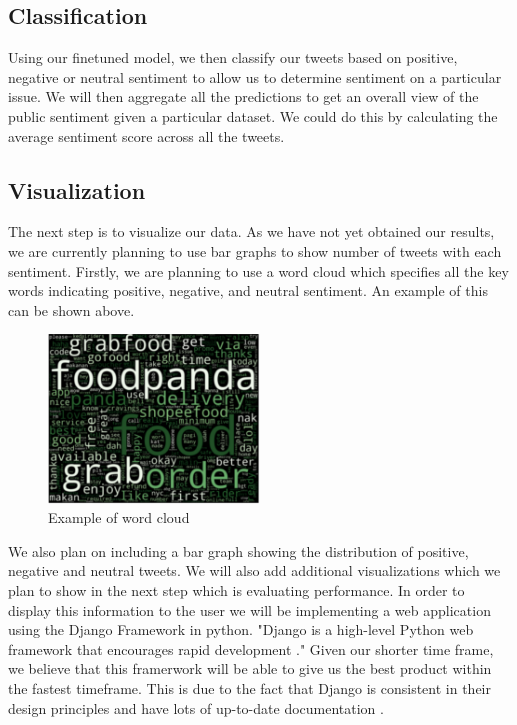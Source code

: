 \documentclass[conference]{IEEEtran}
\begin{document}
\subsection{Classification}
Using our finetuned model, we then classify our tweets based on positive, negative or neutral sentiment to allow us to determine sentiment on a particular issue.  
We will then aggregate all the predictions to get an overall view of the public sentiment given a particular dataset. 
We could do this by calculating the average sentiment score across all the tweets. 

\subsection{Visualization}
The next step is to visualize our data. 
As we have not yet obtained our results, we are currently planning to use bar graphs to show number of tweets with each sentiment. 
Firstly, we are planning to use a word cloud which specifies all the key words indicating positive, negative, and neutral sentiment. 
An example of this can be shown above.

\begin{figure}[t]
    \includegraphics[width=0.5\textwidth]{wordcloud.png}
    \caption{Example of word cloud\cite{b2}}
\end{figure}

 We also plan on including a bar graph showing the distribution of positive, negative and neutral tweets. 
 We will also add additional visualizations which we plan to show in the next step which is evaluating performance.
 In order to display this information to the user we will be implementing a web application using the Django Framework in python. 
 "Django is a high-level Python web framework that encourages rapid development \cite{b14}."
 Given our shorter time frame, we believe that this framerwork will be able to give us the best product within the fastest timeframe.
 This is due to the fact that Django is consistent in their design principles and have lots of up-to-date documentation \cite{b15}. 
  
\end{document}
